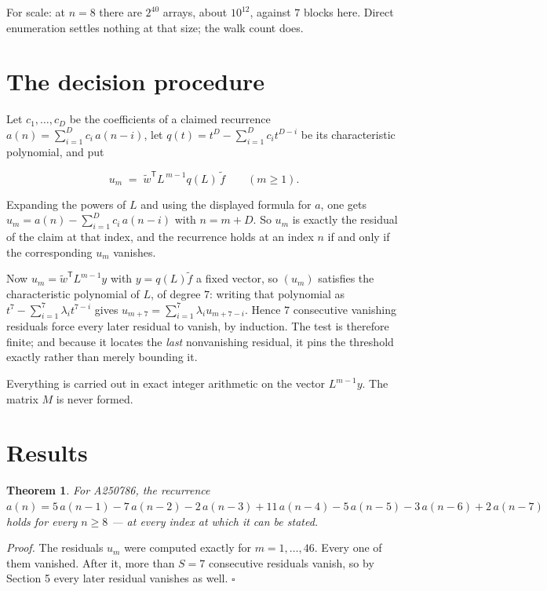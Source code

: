 \documentclass[11pt]{article}
\newtheorem{theorem}{Theorem}
\theoremstyle{definition}
\begin{document}
For scale: at $n = 8$ there are $2^{40}$ arrays, about $10^{12}$, against $7$ blocks here. Direct enumeration settles nothing at that size; the walk count does.

\section{The decision procedure}

Let $c_1,\dots,c_D$ be the coefficients of a claimed recurrence $a(n) = \sum_{i=1}^{D} c_i\,a(n-i)$, let $q(t) = t^{D} - \sum_{i=1}^{D} c_i t^{D-i}$ be its characteristic polynomial, and put

\[u_m \;=\; \tilde w^{\mathsf T} L^{\,m-1} q(L)\,\tilde f \qquad (m \ge 1).\]

Expanding the powers of $L$ and using the displayed formula for $a$, one gets $u_m = a(n) - \sum_{i=1}^{D} c_i\,a(n-i)$ with $n = m + D$. So $u_m$ is exactly the residual of the claim at that index, and the recurrence holds at an index $n$ if and only if the corresponding $u_m$ vanishes.

Now $u_m = \tilde w^{\mathsf T} L^{m-1} y$ with $y = q(L)\tilde f$ a fixed vector, so $(u_m)$ satisfies the characteristic polynomial of $L$, of degree $7$: writing that polynomial as $t^{7} - \sum_{i=1}^{7} \lambda_i t^{7-i}$ gives $u_{m+7} = \sum_{i=1}^{7} \lambda_i u_{m+7-i}$. Hence $7$ consecutive vanishing residuals force every later residual to vanish, by induction. The test is therefore finite; and because it locates the {\itshape last} nonvanishing residual, it pins the threshold exactly rather than merely bounding it.

Everything is carried out in exact integer arithmetic on the vector $L^{m-1}y$. The matrix $M$ is never formed.

\section{Results}

\begin{theorem} For A250786, the recurrence $a(n) = 5\,a(n-1) - 7\,a(n-2) - 2\,a(n-3) + 11\,a(n-4) - 5\,a(n-5) - 3\,a(n-6) + 2\,a(n-7)$ holds for every $n \ge 8$ --- at every index at which it can be stated.\end{theorem}

{\itshape Proof.} The residuals $u_m$ were computed exactly for $m = 1,\dots,46$. Every one of them vanished. After it, more than $S = 7$ consecutive residuals vanish, so by Section 5 every later residual vanishes as well. $\square$
\end{document}
